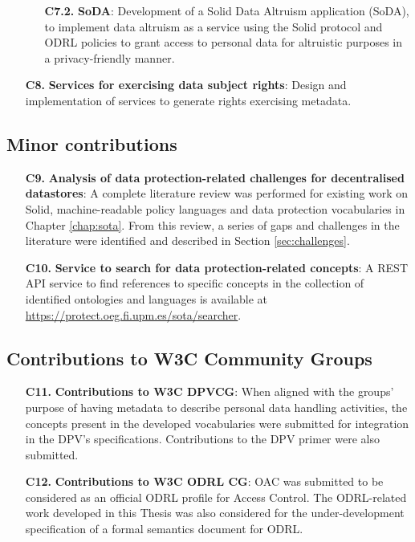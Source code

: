 \begin{enumerate}
\begin{enumerate}
    \item [\textbf{C7.2.}] \textbf{SoDA}: Development of a Solid Data Altruism application (SoDA), to implement data altruism as a service using the Solid protocol and ODRL policies to grant access to personal data for altruistic purposes in a privacy-friendly manner.
    \end{enumerate}
    \item [\textbf{C8.}] \textbf{Services for exercising data subject rights}: Design and implementation of services to generate rights exercising metadata.
\end{enumerate}

\subsection{Minor contributions}
\label{sec:contr_minor}

\begin{enumerate}
    \item [\textbf{C9.}] \textbf{Analysis of data protection-related challenges for decentralised datastores}: A complete literature review was performed for existing work on Solid, machine-readable policy languages and data protection vocabularies in Chapter \ref{chap:sota}. From this review, a series of gaps and challenges in the literature were identified and described in Section \ref{sec:challenges}.
    \item [\textbf{C10.}] \textbf{Service to search for data protection-related concepts}: A REST API service to find references to specific concepts in the collection of identified ontologies and languages is available at \url{https://protect.oeg.fi.upm.es/sota/searcher}.
\end{enumerate}

\subsection{Contributions to W3C Community Groups}
\label{sec:contr_w3c}

\begin{enumerate}
    \item [\textbf{C11.}] \textbf{Contributions to W3C DPVCG}: When aligned with the groups' purpose of having metadata to describe personal data handling activities, the concepts present in the developed vocabularies were submitted for integration in the DPV's specifications. Contributions to the DPV primer were also submitted.
    \item [\textbf{C12.}] \textbf{Contributions to W3C ODRL CG}: OAC was submitted to be considered as an official ODRL profile for Access Control. The ODRL-related work developed in this Thesis was also considered for the under-development specification of a formal semantics document for ODRL.
\end{enumerate}
